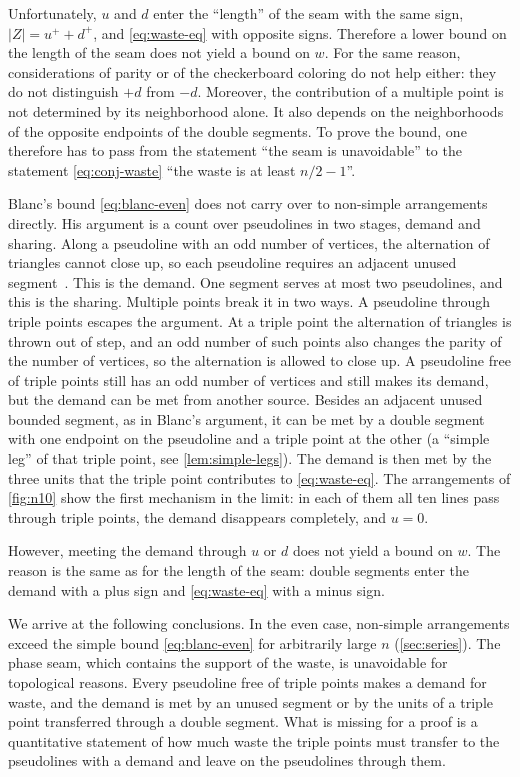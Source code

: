 Unfortunately, $u$ and $d$ enter the ``length'' of the seam with the same sign, $|Z|=u^++d^+$, and \eqref{eq:waste-eq} with opposite signs. Therefore a lower bound on the length of the seam does not yield a bound on $w$. For the same reason, considerations of parity or of the checkerboard coloring do not help either: they do not distinguish $+d$ from $-d$. Moreover, the contribution of a multiple point is not determined by its neighborhood alone. It also depends on the neighborhoods of the opposite endpoints of the double segments. To prove the bound, one therefore has to pass from the statement ``the seam is unavoidable'' to the statement \eqref{eq:conj-waste} ``the waste is at least $n/2-1$''.

Blanc's bound \eqref{eq:blanc-even} does not carry over to non-simple arrangements directly. His argument is a count over pseudolines in two stages, demand and sharing. Along a pseudoline with an odd number of vertices, the alternation of triangles cannot close up, so each pseudoline requires an adjacent unused segment~\cite[Proposition~2.3]{blanc11}. This is the demand. One segment serves at most two pseudolines, and this is the sharing. Multiple points break it in two ways. A pseudoline through triple points escapes the argument. At a triple point the alternation of triangles is thrown out of step, and an odd number of such points also changes the parity of the number of vertices, so the alternation is allowed to close up. A pseudoline free of triple points still has an odd number of vertices and still makes its demand, but the demand can be met from another source. Besides an adjacent unused bounded segment, as in Blanc's argument, it can be met by a double segment with one endpoint on the pseudoline and a triple point at the other (a ``simple leg'' of that triple point, see \cref{lem:simple-legs}). The demand is then met by the three units that the triple point contributes to \eqref{eq:waste-eq}. The arrangements of \cref{fig:n10} show the first mechanism in the limit: in each of them all ten lines pass through triple points, the demand disappears completely, and $u=0$.

However, meeting the demand through $u$ or $d$ does not yield a bound on $w$. The reason is the same as for the length of the seam: double segments enter the demand with a plus sign and \eqref{eq:waste-eq} with a minus sign.

We arrive at the following conclusions.
In the even case, non-simple arrangements exceed the simple bound \eqref{eq:blanc-even} for arbitrarily large $n$ (\cref{sec:series}).
The phase seam, which contains the support of the waste, is unavoidable for topological reasons.
Every pseudoline free of triple points makes a demand for waste, and the demand is met by an unused segment or by the units of a triple point transferred through a double segment.
What is missing for a proof is a quantitative statement of how much waste the triple points must transfer to the pseudolines with a demand and leave on the pseudolines through them.
